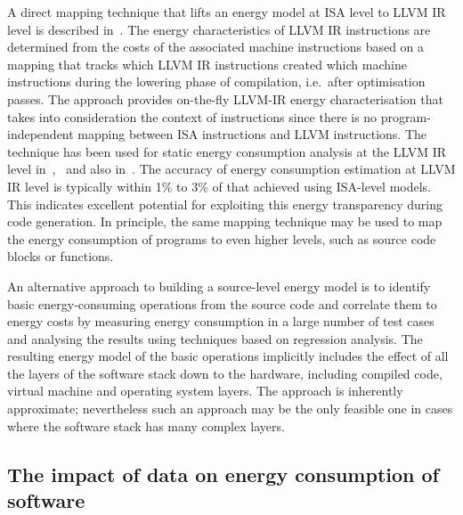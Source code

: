 A direct mapping technique that lifts an energy model at ISA level to LLVM IR
level is described in~\cite{Georgiou15}. The energy characteristics of LLVM IR
instructions are determined from the costs of the associated machine
instructions based on a mapping that tracks which LLVM IR instructions created
which machine instructions during the lowering phase of compilation, i.e.\
after optimisation passes.
%
The approach provides on-the-fly LLVM-IR energy characterisation that takes
into consideration the context of instructions since there is no
program-independent mapping between ISA instructions and LLVM instructions.
%
The technique has been used for static energy consumption analysis at the LLVM
IR level in~\cite{Georgiou15},~\cite{isa-vs-llvm-fopara} and also
in~\cite{grech15}. The accuracy of energy consumption estimation at LLVM IR
level is typically within 1\% to 3\% of that achieved using ISA-level models.
This indicates excellent potential for exploiting this energy transparency
during code generation.
%
In principle, the same mapping technique may be used to map the energy consumption
of programs to even higher levels, such as source code blocks or functions. 

An alternative approach to building a source-level energy model is to identify
basic energy-consuming operations from the source code and correlate them to
energy costs by measuring energy consumption in a large number of test cases
and analysing the results using techniques based on regression analysis. The
resulting energy model of the basic operations implicitly includes the effect
of all the layers of the software stack down to the hardware, including
compiled code, virtual machine and operating system layers. The approach is
inherently approximate; nevertheless such an approach may be the only feasible
one in cases where the software stack has many complex layers.

\subsection{The impact of data on energy consumption of software}\label{subsec:data}

